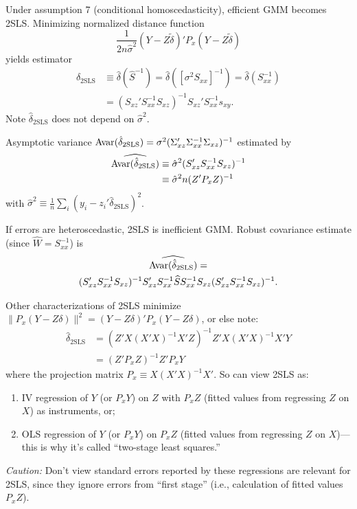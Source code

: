 \documentclass[8pt,letterpaper, landscape]{extarticle} %
\begin{document}
\begin{multicols}{3}
\begin{description}
 Under assumption 7 (conditional homoscedasticity), efficient GMM becomes 2SLS. Minimizing normalized distance function
\[ \frac{1}{2n \hat{\sigma}^2}(Y - Z \tilde{\delta})' P_x (Y - Z \tilde{\delta}) \]
yields estimator
\begin{align*}\hat{\delta}_{\text{2SLS}} &\equiv \hat{\delta} (\widehat{S}^{-1}) = \hat{\delta} ([\sigma^2 S_{xx}]^{-1}) = \hat{\delta} (S_{xx}^{-1}) \\
&= (S_{xz}' S_{xx}^{-1} S_{xz})^{-1} S_{xz}' S_{xx}^{-1} s_{xy} .
\end{align*}
Note $ \hat{\delta}_{\text{2SLS}} $ does not depend on $ \hat{\sigma}^{2} $.

Asymptotic variance $ \operatorname{Avar} (\hat{\delta}_{\text{2SLS}}) = \sigma^2 (\Sigma_{xz}' \Sigma_{xx}^{-1} \Sigma_{xz})^{-1} $ estimated by
\begin{align*}
\widehat{\operatorname{Avar} (\hat{\delta}_{\text{2SLS}})}  &\equiv \hat{\sigma}^2 (S_{xz}' S_{xx}^{-1} S_{xz})^{-1} \\
&\equiv \hat{\sigma}^2 n (Z' P_x Z)^{-1}
\end{align*}
with $ \hat{\sigma}^2 \equiv \tfrac{1}{n} \sum_{i} (y_i - z_{i}' \hat{\delta}_{\text{2SLS}})^{2} $.

If errors are heteroscedastic, 2SLS is inefficient GMM. Robust covariance estimate (since $ \widehat{W} = S_{xx}^{-1} $) is
\begin{multline*} \widehat{\operatorname{Avar} (\hat{\delta}_{\text{2SLS}})} = \\ (S_{xz}' S_{xx}^{-1} S_{xz})^{-1} S_{xz}' S_{xx}^{-1} \widehat{S} S_{xx}^{-1} S_{xz} (S_{xz}' S_{xx}^{-1} S_{xz})^{-1}. \end{multline*}

Other characterizations of 2SLS minimize $ \lVert P_x (Y - Z \delta) \rVert^{2} = (Y - Z \delta)' P_x  (Y - Z \delta) $, or else note:
\begin{align*}
\hat{\delta}_{\text{2SLS}} &= (Z' X (X' X)^{-1} X' Z)^{-1} Z' X (X' X)^{-1} X' Y \\
&= (Z' P_x Z)^{-1} Z' P_x Y
\end{align*}
where the projection matrix $ P_x \equiv X (X' X)^{-1} X' $. So can view 2SLS as:
\begin{enumerate}
\item IV regression of $ Y $ (or $ P_x Y $) on $ Z $ with $ P_x Z $ (fitted values from regressing $ Z $ on $ X $) as instruments, or;
\item OLS regression of $ Y $ (or $ P_x Y $) on $ P_x Z $ (fitted values from regressing $ Z $ on $ X $)---this is why it's called ``two-stage least squares.''
\end{enumerate}
\textit{Caution:} Don't view standard errors reported by these regressions are relevant for 2SLS, since they ignore errors from ``first stage'' (i.e., calculation of fitted values $ P_x Z $).


\end{description}
\end{multicols}
\end{document}
